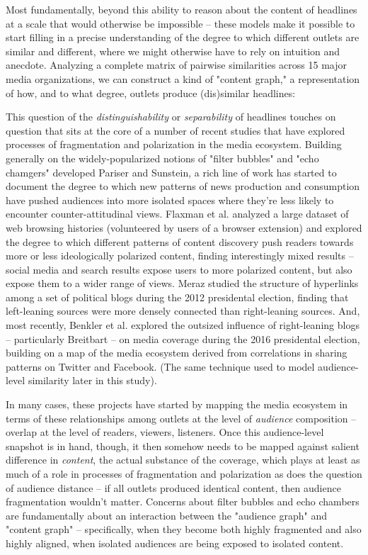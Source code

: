 \documentclass{scrartcl}
\begin{document}
Most fundamentally, beyond this ability to reason about the content of headlines at a scale that would otherwise be impossible -- these models make it possible to start filling in a precise understanding of the degree to which different outlets are similar and different, where we might otherwise have to rely on intuition and anecdote. Analyzing a complete matrix of pairwise similarities across 15 major media organizations, we can construct a kind of "content graph," a representation of how, and to what degree, outlets produce (dis)similar headlines:


This question of the \textit{distinguishability} or \textit{separability} of headlines touches on question that sits at the core of a number of recent studies that have explored processes of fragmentation and polarization in the media ecosystem. Building generally on the widely-popularized notions of "filter bubbles" and "echo chamgers" developed Pariser\cite{pariser2011filter} and Sunstein,\cite{sunstein2003republic} a rich line of work has started to document the degree to which new patterns of news production and consumption have pushed audiences into more isolated spaces where they're less likely to encounter counter-attitudinal views. Flaxman et al. analyzed a large dataset of web browsing histories (volunteered by users of a browser extension) and explored the degree to which different patterns of content discovery push readers towards more or less ideologically polarized content, finding interestingly mixed results -- social media and search results expose users to more polarized content, but also expose them to a wider range of views.\cite{flaxman2016filter} Meraz studied the structure of hyperlinks among a set of political blogs during the 2012 presidental election, finding that left-leaning sources were more densely connected than right-leaning sources.\cite{meraz2015quantifying} And, most recently, Benkler et al. explored the outsized influence of right-leaning blogs -- particularly Breitbart -- on media coverage during the 2016 presidental election, building on a map of the media ecosystem derived from correlations in sharing patterns on Twitter and Facebook.\cite{benkler2017study} (The same technique used to model audience-level similarity later in this study).

In many cases, these projects have started by mapping the media ecosystem in terms of these relationships among outlets at the level of \textit{audience} composition -- overlap at the level of readers, viewers, listeners. Once this audience-level snapshot is in hand, though, it then somehow needs to be mapped against salient difference in \textit{content}, the actual substance of the coverage, which plays at least as much of a role in processes of fragmentation and polarization as does the question of audience distance -- if all outlets produced identical content, then audience fragmentation wouldn't matter. Concerns about filter bubbles and echo chambers are fundamentally about an interaction between the "audience graph" and "content graph" -- specifically, when they become both highly fragmented and also highly aligned, when isolated audiences are being exposed to isolated content.
\end{document}
